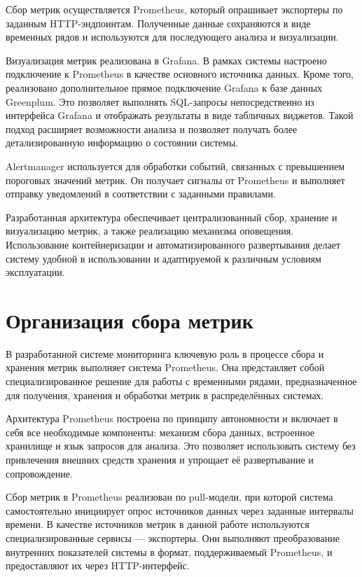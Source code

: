 Сбор метрик осуществляется Prometheus, который опрашивает экспортеры по заданным HTTP-эндпоинтам. Полученные данные сохраняются в виде временных рядов и используются для последующего анализа и визуализации.

Визуализация метрик реализована в Grafana. В рамках системы настроено подключение к Prometheus в качестве основного источника данных. Кроме того, реализовано дополнительное прямое подключение Grafana к базе данных Greenplum. Это позволяет выполнять SQL-запросы непосредственно из интерфейса Grafana и отображать результаты в виде табличных виджетов. Такой подход расширяет возможности анализа и позволяет получать более детализированную информацию о состоянии системы.

Alertmanager используется для обработки событий, связанных с превышением пороговых значений метрик. Он получает сигналы от Prometheus и выполняет отправку уведомлений в соответствии с заданными правилами.

Разработанная архитектура обеспечивает централизованный сбор, хранение и визуализацию метрик, а также реализацию механизма оповещения. Использование контейнеризации и автоматизированного развертывания делает систему удобной в использовании и адаптируемой к различным условиям эксплуатации.


\section{Организация сбора метрик} \label{ch2:prom}

В разработанной системе мониторинга ключевую роль в процессе сбора и хранения метрик выполняет система Prometheus. Она представляет собой специализированное решение для работы с временными рядами, предназначенное для получения, хранения и обработки метрик в распределённых системах.

Архитектура Prometheus построена по принципу автономности и включает в себя все необходимые компоненты: механизм сбора данных, встроенное хранилище и язык запросов для анализа. Это позволяет использовать систему без привлечения внешних средств хранения и упрощает её развертывание и сопровождение.

Сбор метрик в Prometheus реализован по pull-модели, при которой система самостоятельно инициирует опрос источников данных через заданные интервалы времени. В качестве источников метрик в данной работе используются специализированные сервисы — экспортеры. Они выполняют преобразование внутренних показателей системы в формат, поддерживаемый Prometheus, и предоставляют их через HTTP-интерфейс.

